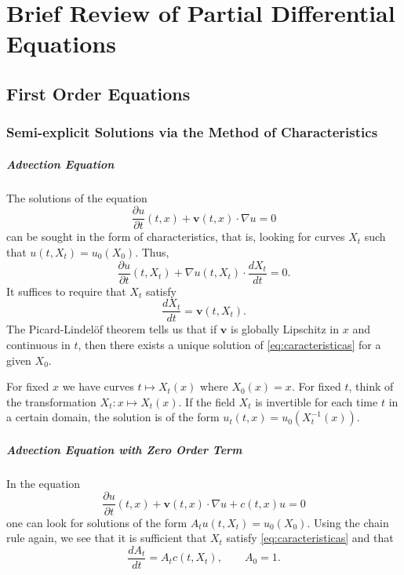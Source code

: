 \chapter{Brief Review of Partial Differential Equations}

\section{First Order Equations}

\subsection{Semi-explicit Solutions via the Method of Characteristics}

\paragraph{Advection Equation}
The solutions of the equation
\begin{equation}
    \label{eq:adveccion}
    \frac{\partial u}{\partial t} (t,x) + \bm v(t,x) \cdot \nabla u  = 0
\end{equation}
can be sought in the form of characteristics, that is, looking for curves $X_t$ such that $u(t,X_t) = u_0(X_0)$. Thus,
\begin{equation*}
    \frac{\partial u}{\partial t} (t,X_t) + \nabla u(t,X_t) \cdot \frac{dX_t}{dt} = 0.
\end{equation*}
It suffices to require that $X_t$ satisfy
\begin{equation}
    \label{eq:caracteristicas}
    \frac{dX_t}{dt} = \bm v(t, X_t).
\end{equation}
The Picard-Lindelöf theorem tells us that if $\bm v$ is globally Lipschitz in $x$ and continuous in $t$, then there exists a unique solution of \eqref{eq:caracteristicas} for a given $X_0$.

\medskip

For fixed $x$ we have curves $t \mapsto X_t(x)$ where $X_0(x) = x$. For fixed $t$, think of the transformation $X_t : x \mapsto X_t(x)$.
If the field $X_t$ is invertible for each time $t$ in a certain domain, the solution is of the form $u_t(t,x) = u_0 (X_t^{-1} (x))$.

\paragraph{Advection Equation with Zero Order Term}
In the equation
\begin{equation}
    \label{eq:adveccion con termino de orden cero}
    \frac{\partial u}{\partial t} (t,x) + \bm v(t,x) \cdot \nabla u + c(t,x) u = 0
\end{equation}
one can look for solutions of the form $A_t u(t,X_t) = u_0 (X_0)$. Using the chain rule again, we see that it is sufficient that $X_t$ satisfy \eqref{eq:caracteristicas} and that
\begin{equation*}
    \frac{dA_t}{dt} = A_t c(t, X_t), \qquad A_0 = 1.
\end{equation*}

